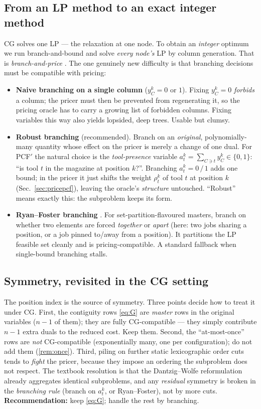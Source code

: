 \documentclass[11pt,a4paper]{article}
\theoremstyle{plain}
\theoremstyle{definition}
\begin{document}
\subsection{From an LP method to an exact integer method}
CG solves one LP --- the relaxation at one node. To obtain an \emph{integer} optimum we run
branch-and-bound and solve \emph{every node's} LP by column generation. That is
\emph{branch-and-price} \citep{Barnhart1998}. The one genuinely new difficulty is that branching
decisions must be compatible with pricing:
\begin{itemize}
\item \textbf{Naive branching on a single column} ($y_C^k\!=\!0$ or $1$). Fixing $y_C^k=0$
      \emph{forbids} a column; the pricer must then be prevented from regenerating it, so the
      pricing oracle has to carry a growing list of forbidden columns. Fixing variables this way
      also yields lopsided, deep trees. Usable but clumsy.
\item \textbf{Robust branching} (recommended). Branch on an \emph{original}, polynomially-many
      quantity whose effect on the pricer is merely a change of one dual. For PCF$'$ the natural
      choice is the \emph{tool-presence} variable $a_t^k=\sum_{C\ni t}y_C^k\in\{0,1\}$: ``is tool
      $t$ in the magazine at position $k$?''. Branching $a_t^k=0\,/\,1$ adds one bound; in the
      pricer it just shifts the weight $\rho_t^k$ of tool $t$ at position $k$
      (Sec.~\ref{sec:pricepcf}), leaving the oracle's \emph{structure} untouched. ``Robust''
      means exactly this: the subproblem keeps its form.
\item \textbf{Ryan--Foster branching} \citep{Ryan1981}. For set-partition-flavoured masters,
      branch on whether two elements are forced \emph{together} or \emph{apart} (here: two jobs
      sharing a position, or a job pinned to/away from a position). It partitions the LP feasible
      set cleanly and is pricing-compatible. A standard fallback when single-bound branching
      stalls.
\end{itemize}

\subsection{Symmetry, revisited in the CG setting}
The position index is the source of symmetry. Three points decide how to treat it under CG.
First, the contiguity rows \eqref{eq:G} are \emph{master} rows in the original variables
($n-1$ of them); they are fully CG-compatible --- they simply contribute $n-1$ extra duals to the
reduced cost. Keep them. Second, the ``at-most-once'' rows are \emph{not} CG-compatible
(exponentially many, one per configuration); do not add them (\cref{rem:once}). Third, piling on
further static lexicographic order cuts tends to \emph{fight} the pricer, because they impose an
ordering the subproblem does not respect. The textbook resolution \citep{Vanderbeck2010,
Lubbecke2005} is that the Dantzig--Wolfe reformulation already aggregates identical
subproblems, and any \emph{residual} symmetry is broken in the \emph{branching rule} (branch on
$a_t^k$, or Ryan--Foster), not by more cuts. \textbf{Recommendation:} keep \eqref{eq:G}; handle
the rest by branching.
\end{document}
